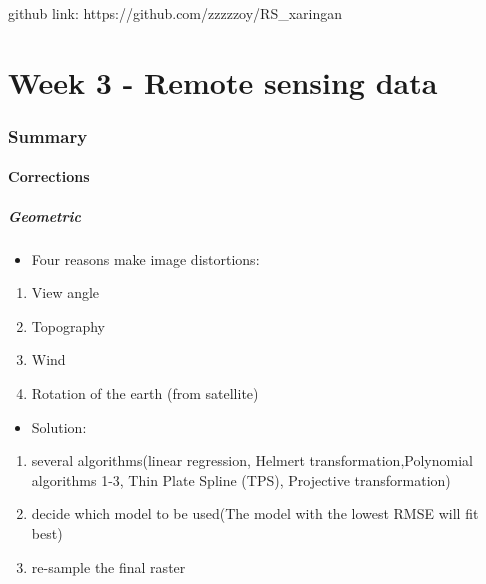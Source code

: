 \documentclass[
  letterpaper,
  DIV=11,
  numbers=noendperiod]{scrreprt}
\let\oldparagraph\paragraph
\renewcommand{\paragraph}[1]{\oldparagraph{#1}\mbox{}}
\providecommand{\tightlist}{%
  \setlength{\itemsep}{0pt}\setlength{\parskip}{0pt}}\usepackage{longtable,booktabs,array}
\begin{document}
github link: https://github.com/zzzzzoy/RS\_xaringan


\hypertarget{week-3---remote-sensing-data}{%
\chapter{Week 3 - Remote sensing
data}\label{week-3---remote-sensing-data}}

\hypertarget{summary-1}{%
\subsection{Summary}\label{summary-1}}

\hypertarget{corrections}{%
\subsubsection{Corrections}\label{corrections}}

\hypertarget{geometric}{%
\paragraph{Geometric}\label{geometric}}

\begin{itemize}
\tightlist
\item
  Four reasons make image distortions:
\end{itemize}

\begin{enumerate}
\def\labelenumi{\arabic{enumi}.}
\tightlist
\item
  View angle
\item
  Topography
\item
  Wind
\item
  Rotation of the earth (from satellite)
\end{enumerate}

\begin{itemize}
\tightlist
\item
  Solution:
\end{itemize}

\begin{enumerate}
\def\labelenumi{\arabic{enumi}.}
\tightlist
\item
  several algorithms(linear regression, Helmert
  transformation,Polynomial algorithms 1-3, Thin Plate Spline (TPS),
  Projective transformation)
\item
  decide which model to be used(The model with the lowest RMSE will fit
  best)
\item
  re-sample the final raster
\end{enumerate}
\end{document}

